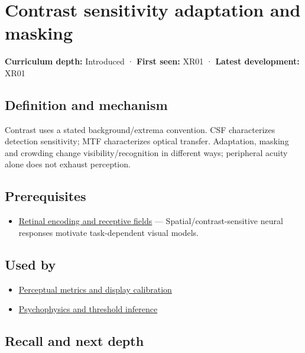 \hypertarget{appendix-b3aa9e8e01ad}{}\label{referencestart:appendix-b3aa9e8e01ad}
\section{Contrast sensitivity adaptation and masking}\label{appendix-b3aa9e8e01ad-contrast-sensitivity-adaptation-and-masking}

\textbf{Curriculum depth:} Introduced · \textbf{First seen:} XR01 · \textbf{Latest development:} XR01

\subsection{Definition and mechanism}\label{appendix-b3aa9e8e01ad-definition-and-mechanism}

Contrast uses a stated background/extrema convention. CSF characterizes detection sensitivity; MTF characterizes optical transfer. Adaptation, masking and crowding change visibility/recognition in different ways; peripheral acuity alone does not exhaust perception.

\subsection{Prerequisites}\label{appendix-b3aa9e8e01ad-prerequisites}

\begin{itemize}
\tightlist
\item
  \hyperref[appendix-7281c15ac44a]{Retinal encoding and receptive fields} --- Spatial/contrast-sensitive neural responses motivate task-dependent visual models.
\end{itemize}

\subsection{Used by}\label{appendix-b3aa9e8e01ad-used-by}

\begin{itemize}
\tightlist
\item
  \hyperref[appendix-b2c1846508bf]{Perceptual metrics and display calibration}
\item
  \hyperref[appendix-1759f03e8ce7]{Psychophysics and threshold inference}
\end{itemize}

\subsection{Recall and next depth}\label{appendix-b3aa9e8e01ad-recall-and-next-depth}

